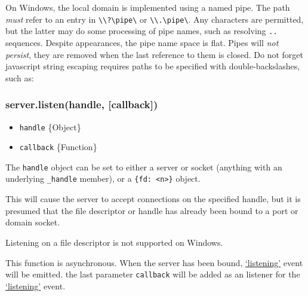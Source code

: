 On Windows, the local domain is implemented using a named pipe. The path
\emph{must} refer to an entry in
\texttt{\textbackslash{}\textbackslash{}?\textbackslash{}pipe\textbackslash{}}
or
\texttt{\textbackslash{}\textbackslash{}.\textbackslash{}pipe\textbackslash{}}.
Any characters are permitted, but the latter may do some processing of
pipe names, such as resolving \texttt{..} sequences. Despite
appearances, the pipe name space is flat. Pipes will \emph{not persist},
they are removed when the last reference to them is closed. Do not
forget javascript string escaping requires paths to be specified with
double-backslashes, such as:

\begin{Shaded}
\begin{Highlighting}[]
\NormalTok{(}
    \NormalTok{(}\CharTok{\textbackslash{}\textbackslash{}\textbackslash{}\textbackslash{}}\CharTok{\textbackslash{}\textbackslash{}}\NormalTok{, }\NormalTok{(), }\NormalTok{))}
\end{Highlighting}
\end{Shaded}

\subsubsection{server.listen(handle,
{[}callback{]})}\label{server.listenhandle-callback}

\begin{itemize}
\itemsep1pt\parskip0pt
\item
  \texttt{handle} \{Object\}
\item
  \texttt{callback} \{Function\}
\end{itemize}

The \texttt{handle} object can be set to either a server or socket
(anything with an underlying \texttt{\_handle} member), or a
\texttt{\{fd: \textless{}n\textgreater{}\}} object.

This will cause the server to accept connections on the specified
handle, but it is presumed that the file descriptor or handle has
already been bound to a port or domain socket.

Listening on a file descriptor is not supported on Windows.

This function is asynchronous. When the server has been bound,
\hyperref[netux5feventux5flistening]{`listening'} event will be emitted.
the last parameter \texttt{callback} will be added as an listener for
the \hyperref[netux5feventux5flistening]{`listening'} event.

